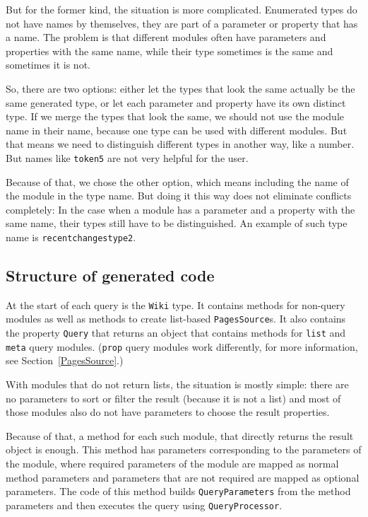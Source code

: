 But for the former kind, the situation is more complicated.
Enumerated types do not have names by themselves, they are part of a parameter or property that has a name.
The problem is that different modules often have parameters and properties with the same name,
while their type sometimes is the same and sometimes it is not.

So, there are two options: either let the types that look the same actually be the same generated type,
or let each parameter and property have its own distinct type.
If we merge the types that look the same, we should not use the module name in their name,
because one type can be used with different modules.
But that means we need to distinguish different types in another way, like a number.
But names like \lstinline{token5} are not very helpful for the user.

Because of that, we chose the other option, which means including the name of the module in the type name.
But doing it this way does not eliminate conflicts completely:
In the case when a module has a parameter and a property with the same name,
their types still have to be distinguished.
An example of such type name is \lstinline{recentchangestype2}.

\subsection{Structure of generated code}
\label{ltwcg-structure}

At the start of each query is the \lstinline{Wiki} type.
It contains methods for non-query modules as well as methods to create list-based \lstinline{PagesSource}s.
It also contains the property \lstinline{Query} that returns an object that contains methods for
\texttt{list} and \texttt{meta} query modules.
(\texttt{prop} query modules work differently, for more information, see Section~\ref{PagesSource}.)

\medskip

With modules that do not return lists, the situation is mostly simple:
there are no parameters to sort or filter the result (because it is not a list)
and most of those modules also do not have parameters to choose the result properties.

Because of that, a method for each such module, that directly returns the result object is enough.
This method has parameters corresponding to the parameters of the module,
where required parameters of the module are mapped as normal method parameters
and parameters that are not required are mapped as optional parameters.
The code of this method builds \lstinline{QueryParameters} from the method parameters
and then executes the query using \lstinline{QueryProcessor}.

